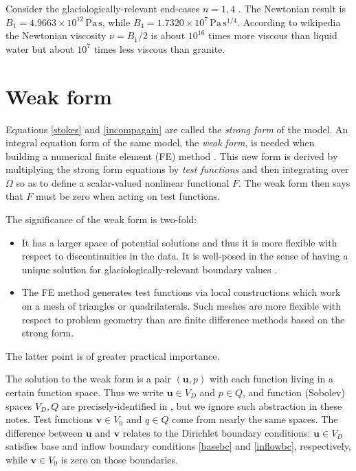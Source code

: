 \documentclass[letterpaper,final,12pt,reqno]{amsart}
\newcommand{\bu}{\mathbf{u}}
\newcommand{\bv}{\mathbf{v}}
\begin{document}
Consider the glaciologically-relevant end-cases $n=1,4$ \cite{GoldsbyKohlstedt2001}.  The Newtonian result is $B_1=4.9663\times 10^{12}\,\text{Pa}\,\text{s}$, while $B_4=1.7320\times 10^{7}\,\text{Pa}\,\text{s}^{1/4}$.  According to wikipedia the Newtonian viscosity $\nu=B_1/2$ is about $10^{16}$ times more viscous than liquid water but about $10^7$ times less viscous than granite.


\section{Weak form} \label{sec:weakform}

Equations \eqref{stokes} and \eqref{incompagain} are called the \emph{strong form} of the model.  An integral equation form of the same model, the \emph{weak form}, is needed when building a numerical finite element (FE) method \cite{Elmanetal2014}.  This new form is derived by multiplying the strong form equations by \emph{test functions} and then integrating over $\Omega$ so as to define a scalar-valued nonlinear functional $F$.  The weak form then says that $F$ must be zero when acting on test functions.

The significance of the weak form is two-fold:
\begin{itemize}
\item It has a larger space of potential solutions and thus it is more flexible with respect to discontinuities in the data.  It is well-posed in the sense of having a unique solution  for glaciologically-relevant boundary values \cite{JouvetRappaz2011}.
\item The FE method generates test functions via local constructions which work on a mesh of triangles or quadrilaterals.  Such meshes are more flexible with respect to problem geometry than are finite difference methods based on the strong form.
\end{itemize}
The latter point is of greater practical importance.

The solution to the weak form is a pair $(\bu,p)$ with each function living in a certain function space.  Thus we write $\bu\in V_D$ and $p \in Q$, and function (Sobolev) spaces $V_D,Q$ are precisely-identified in \cite{JouvetRappaz2011}, but we ignore such abstraction in these notes.  Test functions $\bv\in V_0$ and $q\in Q$ come from nearly the same spaces.  The difference between $\bu$ and $\bv$ relates to the Dirichlet boundary conditions: $\bu\in V_D$ satisfies base and inflow boundary conditions \eqref{basebc} and \eqref{inflowbc}, respectively, while $\bv\in V_0$ is zero on those boundaries.
\end{document}
